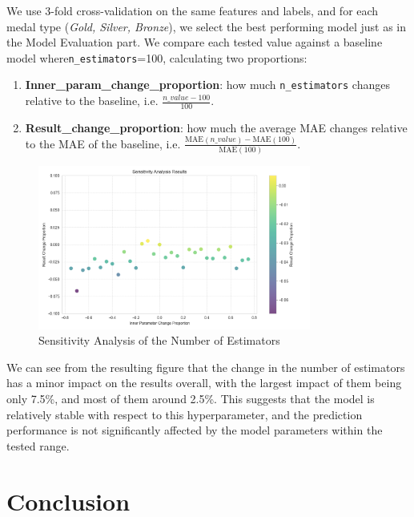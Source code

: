 \documentclass{mcmthesis}
\begin{document}
We use 3-fold cross-validation on the same features and labels, and for each medal type
(\textit{Gold, Silver, Bronze}), we select the best performing model just as in the Model Evaluation part.
We compare each tested value against a baseline model where\texttt{n\_estimators}=100, calculating two proportions:
\begin{enumerate}
    \item \textbf{Inner\_param\_change\_proportion}: how much \texttt{n\_estimators} changes
    relative to the baseline, i.e. \(\frac{n\_value - 100}{100}\).
    \item \textbf{Result\_change\_proportion}: how much the average MAE changes
    relative to the MAE of the baseline, i.e. \(\frac{\text{MAE}(n\_value) - \text{MAE}(100)}{\text{MAE}(100)}\).
\end{enumerate}

\begin{figure}[htbp]
    \centering
    \includegraphics[width=0.8\textwidth]{pics/sensitivity_analysis.png}
    \caption{Sensitivity Analysis of the Number of Estimators}
    \label{fig:sensitivity_analysis}
\end{figure}

We can see from the resulting figure that the change in the number of estimators has a minor impact on the results overall, with the largest impact of them being only 7.5\%, and most of them around 2.5\%. This suggests that the model is relatively stable with respect to this hyperparameter, and the prediction performance is not significantly affected by the model parameters within the tested range.

\section{Conclusion}
\end{document}

